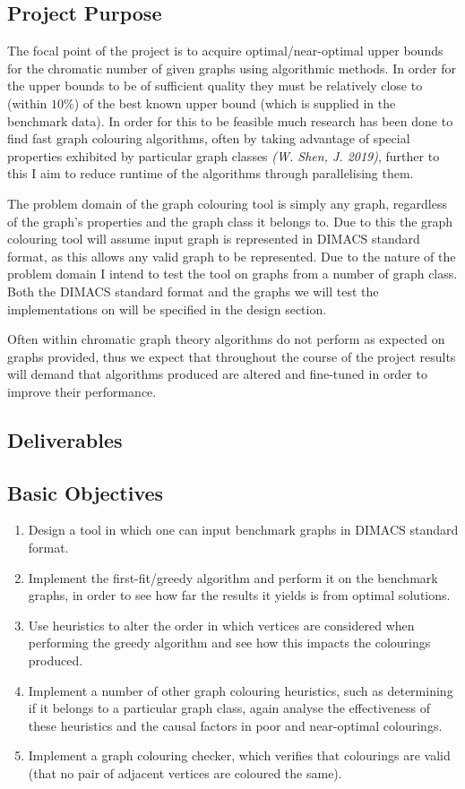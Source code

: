 \documentclass[12pt,a4paper]{article}
\begin{document}
\subsection*{Project Purpose}
\noindent
The focal point of the project is to acquire optimal/near-optimal upper bounds for the chromatic number of given graphs using algorithmic methods. In order for the upper bounds to be of sufficient quality they must be relatively close to (within $10\%$) of the best known upper bound (which is supplied in the benchmark data). In order for this to be feasible much research has been done to find fast graph colouring algorithms, often by taking advantage of special properties exhibited by particular graph classes \textit{(W. Shen, J. 2019)}, further to this I aim to reduce runtime of the algorithms through parallelising them. 
\par The problem domain of the graph colouring tool is simply any graph, regardless of the graph's properties and the graph class it belongs to. Due to this the graph colouring tool will assume input graph is represented in DIMACS standard format, as this allows any valid graph to be represented. Due to the nature of the problem domain I intend to test the tool on graphs from a number of graph class. Both the DIMACS standard format and the graphs we will test the implementations on will be specified in the design section.
\par Often within chromatic graph theory algorithms do not perform as expected on graphs provided, thus we expect that throughout the course of the project results will demand that algorithms produced are altered and fine-tuned in order to improve their performance.
\subsection*{Deliverables}
\subsection*{Basic  Objectives}
\begin{enumerate}[label = \textbf{B\arabic*}]
\itemsep0em
\item Design a tool in which one can input benchmark graphs in DIMACS standard format. 
\item Implement the first-fit/greedy algorithm and perform it on the benchmark graphs, in order to see how far the results it yields is from optimal solutions. 
\item Use heuristics to alter the order in which vertices are considered when performing the greedy algorithm and see how this impacts the colourings produced.
\item Implement a number of other graph colouring heuristics, such as determining if it belongs to a particular graph class, again analyse the effectiveness of these heuristics and the causal factors in poor and near-optimal colourings.
\item Implement a graph colouring checker, which verifies that colourings are valid (that no pair of adjacent vertices are coloured the same).
\end{enumerate}
\end{document}
